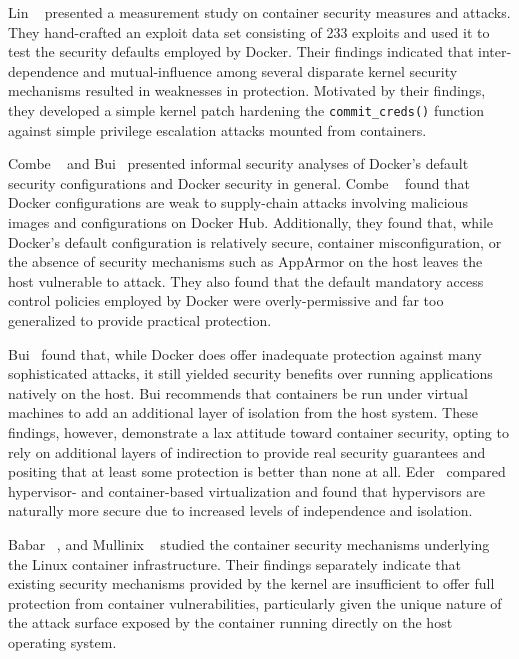 Lin \etal~\cite{lin2018_container_security} presented a measurement study on container
security measures and attacks. They hand-crafted an exploit data set consisting of 233
exploits and used it to test the security defaults employed by Docker. Their findings
indicated that inter-dependence and mutual-influence among several disparate kernel
security mechanisms resulted in weaknesses in protection. Motivated by their findings,
they developed a simple kernel patch hardening the \texttt{commit\_creds()} function
against simple privilege escalation attacks mounted from containers.

Combe \etal~\cite{combe2016_to_docker} and Bui~\cite{bui2015_docker_analysis} presented
informal security analyses of Docker's default security configurations and Docker security
in general. Combe \etal~\cite{combe2016_to_docker} found that Docker configurations are
weak to supply-chain attacks involving malicious images and configurations on Docker Hub.
Additionally, they found that, while Docker's default configuration is relatively secure,
container misconfiguration, or the absence of security mechanisms such as AppArmor on the
host leaves the host vulnerable to attack. They also found that the default mandatory
access control policies employed by Docker were overly-permissive and far too generalized
to provide practical protection.

Bui~\cite{bui2015_docker_analysis} found that, while Docker does offer inadequate
protection against many sophisticated attacks, it still yielded security benefits over
running applications natively on the host. Bui recommends that containers be run under
virtual machines to add an additional layer of isolation from the host system. These
findings, however, demonstrate a lax attitude toward container security, opting to rely on
additional layers of indirection to provide real security guarantees and positing that at
least some protection is better than none at all.
Eder~\cite{eder2016_hypervisor_container} compared hypervisor- and container-based
virtualization and found that hypervisors are naturally more secure due to increased
levels of independence and isolation.

Babar \etal~\cite{babar2017_understanding}, and Mullinix
\etal~\cite{mullinix2020_security_measures} studied the container security mechanisms
underlying the Linux container infrastructure. Their findings separately indicate that
existing security mechanisms provided by the kernel are insufficient to offer full
protection from container vulnerabilities, particularly given the unique nature of the
attack surface exposed by the container running directly on the host operating system.

